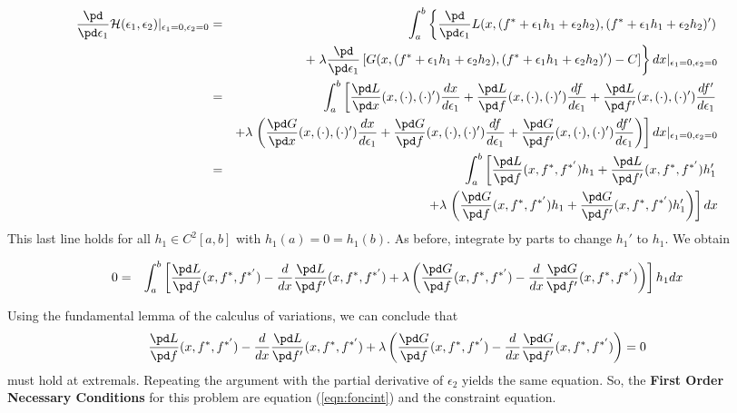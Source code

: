 \begin{eqnarray*}
 \frac{\pd}{\pd\epsilon_1}{\cal H}(\epsilon_1,\epsilon_2)\vert_{\epsilon_1=0,\epsilon_2=0} &=&  \int_a^b\left\{ \frac{\pd}{\pd\epsilon_1}L(x, (f^* + \epsilon_1 h_1 + \epsilon_2 h_2), (f^* + \epsilon_1 h_1 + \epsilon_2 h_2)')\right.  \\
 &&+ \left.\lambda\frac{\pd}{\pd\epsilon_1}\left[G(x, (f^* + \epsilon_1 h_1 + \epsilon_2 h_2), (f^* + \epsilon_1 h_1 + \epsilon_2 h_2)') - C\right] \right\}dx\vert_{\epsilon_1=0,\epsilon_2=0}\\
&=& \int_a^b \left[ \frac{\pd L}{\pd x}(x, (\cdot), (\cdot)')\frac{dx}{d\epsilon_1} + \frac{\pd L}{\pd f}(x, (\cdot), ( \cdot)')\frac{df}{d\epsilon_1} + \frac{\pd L}{\pd f'}(x, (\cdot), (\cdot)')\frac{df'}{d\epsilon_1}\right.\\
&&+\lambda \left.\left(\frac{\pd G}{\pd x}(x, (\cdot), (\cdot)')\frac{dx}{d\epsilon_1} + \frac{\pd G}{\pd f}(x, (\cdot), ( \cdot)')\frac{df}{d\epsilon_1} + \frac{\pd G}{\pd f'}(x, (\cdot), (\cdot)')\frac{df'}{d\epsilon_1}\right)\right]dx\vert_{\epsilon_1=0,\epsilon_2=0}\\
&=& \int_a^b \left[  \frac{\pd L}{\pd f}(x, f^*, f^{*'})h_1 + \frac{\pd L}{\pd f'}(x, f^*, f^{*'})h_1'\right.\\
&&+\lambda \left.\left( \frac{\pd G}{\pd f}(x, f^*, f^{*'})h_1 + \frac{\pd G}{\pd f'}(x, f^*, f^{*'})h_1'\right)\right]dx
\end{eqnarray*}
This last line holds for all $h_1\in C^2[a,b]$ with $h_1(a) = 0 = h_1(b)$.  As before, integrate by parts  to change $h_1'$ to $h_1$.  We obtain

\begin{eqnarray*}
0 &=& \int_a^b \left[  \frac{\pd L}{\pd f}(x, f^*, f^{*'})- \frac{d}{dx}\frac{\pd L}{\pd f'}(x, f^*, f^{*'})+\lambda \left( \frac{\pd G}{\pd f}(x, f^*, f^{*'})- \frac{d}{dx} \frac{\pd G}{\pd f'}(x, f^*, f^{*'})\right)\right]h_1dx \end{eqnarray*}

Using the fundamental lemma of the calculus of variations, we can conclude that 
\begin{equation}\label{eqn:foncint}
\frac{\pd L}{\pd f}(x, f^*, f^{*'})- \frac{d}{dx}\frac{\pd L}{\pd f'}(x, f^*, f^{*'})+\lambda \left( \frac{\pd G}{\pd f}(x, f^*, f^{*'})- \frac{d}{dx} \frac{\pd G}{\pd f'}(x, f^*, f^{*'})\right) = 0
\end{equation}
must hold at extremals. Repeating the argument with the partial derivative of $\epsilon_2$ yields the same equation. So, the {\bf First Order Necessary Conditions} for this problem are equation (\ref{eqn:foncint}) and the constraint equation.
\medskip

